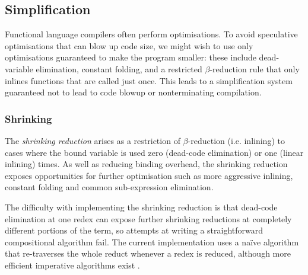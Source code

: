 
\subsection{Simplification}

Functional language compilers often perform optimisations. To avoid speculative
optimisations that can blow up code size, we might wish to use only
optimisations guaranteed to make the program smaller: these include
dead-variable elimination, constant folding, and a restricted $\beta$-reduction
rule that only inlines functions that are called just once. This leads to a
simplification system guaranteed not to lead to code blowup or nonterminating
compilation.


\subsubsection{Shrinking}

The \emph{shrinking reduction} arises as a restriction of $\beta$-reduction
(i.e. inlining) to cases where the bound variable is used zero (dead-code
elimination) or one (linear inlining) times. As well as reducing binding
overhead, the shrinking reduction exposes opportunities for further optimisation
such as more aggressive inlining, constant folding and common sub-expression
elimination.

The difficulty with implementing the shrinking reduction is that dead-code
elimination at one redex can expose further shrinking reductions at completely
different portions of the term, so attempts at writing a straightforward
compositional algorithm fail. The current implementation uses a na\"ive
algorithm that re-traverses the whole reduct whenever a redex is reduced,
although more efficient imperative algorithms exist
\cite{Appel:1997gs,Benton:2004ua,Kennedy:2007cb}.

